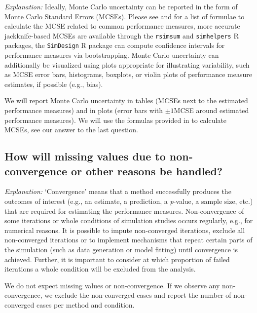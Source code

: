 \documentclass[12pt]{article}
\begin{document}
\textit{Explanation:} Ideally, Monte Carlo uncertainty can be reported in the form of Monte Carlo Standard Errors (MCSEs). Please see \textcite{Siepe2023} and \textcite{Morris2019} for a list of formulae to calculate the MCSE related to common performance measures, more accurate jackknife-based MCSEs are available through the \texttt{rsimsum} \parencite{Gasparini2018} and \texttt{simhelpers} \parencite{Simhelpers2022} R packages, the \texttt{SimDesign} \parencite{Chalmers2020} R package can compute confidence intervals for performance measures via bootstrapping. Monte Carlo uncertainty can additionally be visualized using plots appropriate for illustrating variability, such as MCSE error bars, histograms, boxplots, or violin plots of performance measure estimates, if possible (e.g., bias).

\begin{examplebox}
We will report Monte Carlo uncertainty in tables (MCSEs next to the estimated performance measures) and in plots (error bars with $\pm 1$MCSE around estimated performance measures). We will use the formulas provided in \textcite{Siepe2023} to calculate MCSEs, see our answer to the last question.
\end{examplebox}

\subsection{How will missing values due to non-convergence or other reasons be handled?}

\textit{Explanation:} `Convergence' means that a method successfully produces the outcomes of interest (e.g., an estimate, a prediction, a \textit{p}-value, a sample size, etc.) that are required for estimating the performance measures. Non-convergence of some iterations or whole conditions of simulation studies occurs regularly, e.g., for numerical reasons. It is possible to impute non-converged iterations, exclude all non-converged iterations or to implement mechanisms that repeat certain parts of the simulation (such as data generation or model fitting) until convergence is achieved. Further, it is important to consider at which proportion of failed iterations a whole condition will be excluded from the analysis.

\begin{examplebox}
We do not expect missing values or non-convergence. If we observe any non-convergence, we exclude the non-converged cases and report the number of non-converged cases per method and condition.
\end{examplebox}
\end{document}
